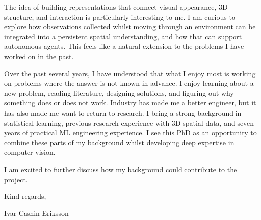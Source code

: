 \documentclass[11pt,a4paper]{moderncv}
\begin{document}
\hspace*{2em}
The idea of building representations that connect visual appearance, 3D structure, and interaction is particularly interesting to me. I am curious to explore how observations collected whilst moving through an environment can be integrated into a persistent spatial understanding, and how that can support autonomous agents. This feels like a natural extension to the problems I have worked on in the past.

\hspace*{2em}
Over the past several years, I have understood that what I enjoy most is working on problems where the answer is not known in advance. I enjoy learning about a new problem, reading literature, designing solutions, and figuring out why something does or does not work. Industry has made me a better engineer, but it has also made me want to return to research. I bring a strong background in statistical learning, previous research experience with 3D spatial data, and seven years of practical ML engineering experience. I see this PhD as an opportunity to combine these parts of my background whilst developing deep expertise in computer vision.

\vspace*{2em}
I am excited to further discuss how my background could contribute to the project.

\vspace*{1em}
Kind regards,

Ivar Cashin Eriksson
\end{document}
